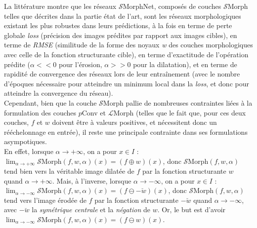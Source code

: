 La littérature montre que les réseaux $\mathcal{S}$MorphNet, composés de couches $\mathcal{S}$Morph telles que décrites dans la partie état de l'art, sont les réseaux morphologiques existant les plus robustes dans leurs prédictions, à la fois en terme de perte globale \textit{loss} (précision des images prédites par rapport aux images cibles), en terme de \textit{RMSE} (similitude de la forme des noyaux \textit{w} des couches morphologiques avec celle de la fonction structurante cible), en terme d'exactitude de l'opération prédite ($\alpha << 0$ pour l'érosion, $\alpha >> 0$ pour la dilatation), et en terme de rapidité de convergence des réseaux lors de leur entraînement (avec le nombre d'époques nécessaire pour atteindre un minimum local dans la \textit{loss}, et donc pour atteindre la convergence du réseau). \\

\vspace{-1.5mm}
Cependant, bien que la couche $\mathcal{S}$Morph pallie de nombreuses contraintes liées à la formulation des couches $p$Conv et $\mathcal{L}$Morph (telles que le fait que, pour ces deux couches, $f$ et $w$ doivent être à valeurs positives, et nécessitent donc un rééchelonnage en entrée), il reste une principale contrainte dans ses formulations asympotiques. \\

\vspace{-2.0mm}
\noindent En effet, lorsque $\alpha \rightarrow +\infty$, on a pour $x \in I$ : $\lim_{\alpha \rightarrow +\infty} \mathcal{S}\text{Morph}(f,w,\alpha)(x) = \left ( f \oplus w \right )(x)$, donc $\mathcal{S}\text{Morph}(f,w,\alpha)$ tend bien vers la véritable image dilatée de $f$ par la fonction structurante $w$ quand $\alpha \rightarrow +\infty$. Mais, à l'inverse, lorsque $\alpha \rightarrow -\infty$, on a pour $x \in I$ : $\lim_{\alpha \rightarrow -\infty} \mathcal{S}\text{Morph}(f,w,\alpha)(x) = \left ( f \ominus -\breve{w} \right )(x)$, donc $\mathcal{S}\text{Morph}(f,w,\alpha)$ tend vers l'image érodée de $f$ par la fonction structurante $-\breve{w}$ quand $\alpha \rightarrow -\infty$, avec $-\breve{w}$ la \textit{symétrique centrale} et la \textit{négation} de $w$. Or, le but est d'avoir $\lim_{\alpha \rightarrow -\infty} \mathcal{S}\text{Morph}(f,w,\alpha)(x) = \left ( f \ominus w \right )(x)$. \\


